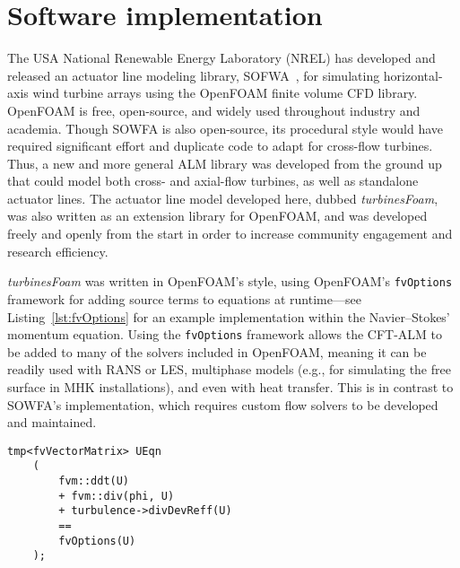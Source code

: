 \section{Software implementation}

The USA National Renewable Energy Laboratory (NREL) has developed and released
an actuator line modeling library, SOFWA~\cite{Churchfield2014b}, for simulating
horizontal-axis wind turbine arrays using the OpenFOAM finite volume CFD
library. OpenFOAM is free, open-source, and widely used throughout industry and
academia. Though SOWFA is also open-source, its procedural style would have
required significant effort and duplicate code to adapt for cross-flow turbines.
Thus, a new and more general ALM library was developed from the ground up that
could model both cross- and axial-flow turbines, as well as standalone actuator
lines. The actuator line model developed here, dubbed \textit{turbinesFoam}, was
also written as an extension library for OpenFOAM, and was developed freely and
openly from the start in order to increase community engagement and research
efficiency.

\textit{turbinesFoam} was written in OpenFOAM's style, using OpenFOAM's
\texttt{fvOptions} framework for adding source terms to equations at
runtime---see Listing~\ref{lst:fvOptions} for an example implementation within
the Navier--Stokes' momentum equation. Using the \texttt{fvOptions} framework
allows the CFT-ALM to be added to many of the solvers included in OpenFOAM,
meaning it can be readily used with RANS or LES, multiphase models (e.g., for
simulating the free surface in MHK installations), and even with heat transfer.
This is in contrast to SOWFA's implementation, which requires custom flow
solvers to be developed and maintained.

\begin{lstlisting}[float,caption=Adding source terms to the momentum equation in OpenFOAM.,label=lst:fvOptions]
    tmp<fvVectorMatrix> UEqn
    (
        fvm::ddt(U)
        + fvm::div(phi, U)
        + turbulence->divDevReff(U)
        ==
        fvOptions(U)
    );
\end{lstlisting}

